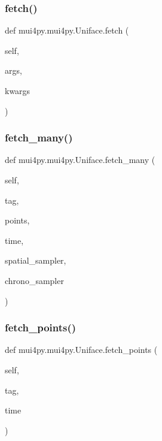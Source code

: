 \subsubsection{\texorpdfstring{fetch()}{fetch()}}
{\footnotesize\ttfamily def mui4py.\+mui4py.\+Uniface.\+fetch (\begin{DoxyParamCaption}\item[{}]{self,  }\item[{}]{args,  }\item[{}]{kwargs }\end{DoxyParamCaption})}

\mbox{\label{classmui4py_1_1mui4py_1_1_uniface_af94c5e538216c639214f505621240a22}} 
\subsubsection{\texorpdfstring{fetch\+\_\+many()}{fetch\_many()}}
{\footnotesize\ttfamily def mui4py.\+mui4py.\+Uniface.\+fetch\+\_\+many (\begin{DoxyParamCaption}\item[{}]{self,  }\item[{}]{tag,  }\item[{}]{points,  }\item[{}]{time,  }\item[{}]{spatial\+\_\+sampler,  }\item[{}]{chrono\+\_\+sampler }\end{DoxyParamCaption})}

\mbox{\label{classmui4py_1_1mui4py_1_1_uniface_ab37ab13940afe06c3697a8bc482f1f7c}} 
\subsubsection{\texorpdfstring{fetch\+\_\+points()}{fetch\_points()}}
{\footnotesize\ttfamily def mui4py.\+mui4py.\+Uniface.\+fetch\+\_\+points (\begin{DoxyParamCaption}\item[{}]{self,  }\item[{}]{tag,  }\item[{}]{time }\end{DoxyParamCaption})}

